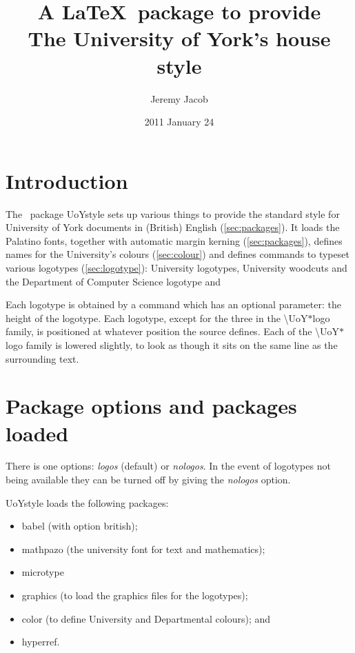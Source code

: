 \documentclass[12pt,a4paper]{scrartcl}
\title{A \LaTeX\ package to provide\\The University of York's house style}
\author{Jeremy Jacob}
\date{2011 January 24}
\DeclareRobustCommand{\cmd}[2]{\textsf{\textbackslash#1}\textit{#2}}
\begin{document}
\maketitle

\section{Introduction}
\label{sec:inroduction}

The \LaTeXe\ package \textsf{UoYstyle} sets up various things to
provide the standard style for University of York documents in
(British) English (\autoref{sec:packages}).  It loads the Palatino
fonts, together with automatic margin kerning
(\autoref{sec:packages}), defines names for the University's colours
(\autoref{sec:colour}) and defines commands to typeset various
logotypes (\autoref{sec:logotype}): University logotypes, University
woodcuts and the Department of Computer Science logotype and

Each logotype is obtained by a command which has an optional
parameter: the height of the logotype.  Each logotype, except for the
three in the \cmd{UoY$*$logo}{} family, is positioned at whatever
position the source defines.  Each of the \cmd{UoY$*$logo}{} family is
lowered slightly, to look as though it sits on the same line as the
surrounding text.

\section{Package options and packages loaded}
\label{sec:packages}

There is one options: \emph{logos} (default) or \emph{nologos}.  In
the event of logotypes not being available they can be turned off by
giving the \emph{nologos} option.

\textsf{UoYstyle} loads the following packages:
\begin{itemize}
\item \textsf{babel} (with option \textsf{british)};
\item \textsf{mathpazo} (the university font for text and
  mathematics);
\item \textsf{microtype}
\item \textsf{graphics} (to load the
  graphics files for the logotypes);
\item \textsf{color} (to define
  University and Departmental colours); and
\item \textsf{hyperref}.
\end{itemize}
\end{document}
